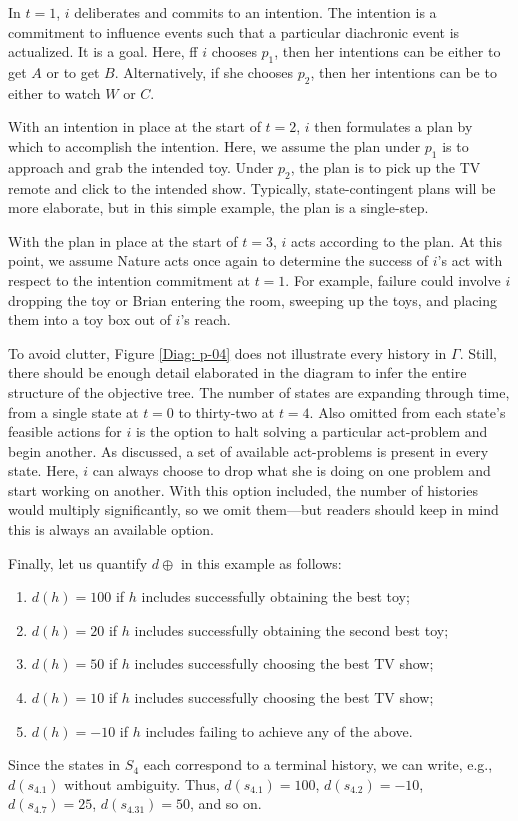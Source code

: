 \documentclass[
11pt,
titlepage,
reqno,
]{article}%
\theoremstyle{definition}
\begin{document}
In $t=1$, $i$ deliberates and commits to an intention. 
The intention is a commitment to influence events such that a particular diachronic event is actualized.
It is a goal. 
Here, ff $i$ chooses $p_1$, then her intentions can be either to get $A$ or to get $B$.
Alternatively, if she chooses $p_2$, then her intentions can be to either to watch $W$ or  $C$.

With an intention in place at the start of $t=2$, $i$ then formulates a plan by which to accomplish the intention. 
Here, we assume the plan under $p_1$ is to approach and grab the intended toy. 
Under  $p_2$, the plan is to pick up the TV remote and click to the intended show.
Typically, state-contingent plans will be more elaborate, but in this simple example, the plan is a single-step.

With the plan in place at the start of $t=3$, $i$ acts according to the plan.
At this point, we assume Nature acts once again to determine the success of $i$'s act with respect to the intention commitment at $t=1$.
For example, failure could involve $i$ dropping the toy or Brian entering the room, sweeping up the toys, and placing them into a toy box out of $i$'s reach.

To avoid clutter, Figure \ref{Diag: p-04} does not illustrate every history in $\Gamma$.
Still, there should be enough detail elaborated in the diagram to infer the entire structure of the objective tree.
The number of states are expanding through time, from a single state at $t=0$ to thirty-two at $t=4$.
Also omitted from each state's feasible actions for $i$ is the option to halt solving a particular act-problem and begin another.
As discussed, a set of available act-problems is present in every state.
Here, $i$ can always choose to drop what she is doing on one problem and start working on another.
With this option included, the number of histories would multiply significantly, so we omit them---but readers should keep in mind this is always an available option.

Finally, let us quantify $d\oplus$ in this example as follows:
\begin{enumerate}
	\item $d(h)=100$ if $h$ includes successfully obtaining the best toy;
	\item $d(h)=20$ if $h$ includes successfully obtaining the second best toy;
	\item $d(h)=50$ if $h$ includes successfully choosing the best TV show;
	\item $d(h)=10$ if $h$ includes successfully choosing the best TV show;
	\item $d(h)=-10$ if $h$ includes failing to achieve any of the above.
\end{enumerate}
Since the states in $S_4$ each correspond to a terminal history, we can write, e.g., $d(s_{4.1})$ without ambiguity.
Thus, $d(s_{4.1})=100$, $d(s_{4.2})=-10$,  $d(s_{4.7})=25$, $d(s_{4.31})=50$, and so on.
\end{document}

